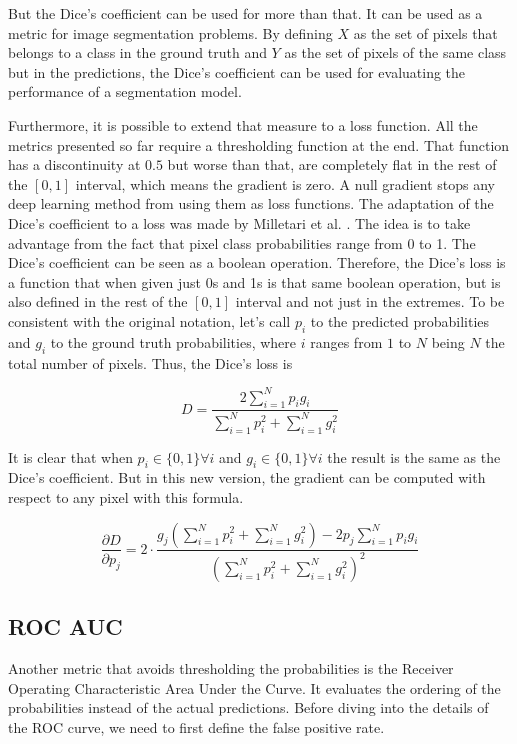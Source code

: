 But the Dice's coefficient can be used for more than that. It can be used as a metric for image segmentation problems. By defining $X$ as the set of pixels that belongs to a class in the ground truth and $Y$ as the set of pixels of the same class but in the predictions, the Dice's coefficient can be used for evaluating the performance of a segmentation model. 

Furthermore, it is possible to extend that measure to a loss function. All the metrics presented so far require a thresholding function at the end. That function has a discontinuity at $0.5$ but worse than that, are completely flat in the rest of the $[0,1]$ interval, which means the gradient is zero. A null gradient stops any deep learning method from using them as loss functions. The adaptation of the Dice's coefficient to a loss was made by Milletari et al. \cite{milletari2016vnet}. The idea is to take advantage from the fact that pixel class probabilities range from 0 to 1. The Dice's coefficient can be seen as a boolean operation. Therefore, the Dice's loss is a function that when given just 0s and 1s is that same boolean operation, but is also defined in the rest of the $[0,1]$ interval and not just in the extremes. To be consistent with the original notation, let's call $p_i$ to the predicted probabilities and $g_i$ to the ground truth probabilities, where $i$ ranges from $1$ to $N$ being $N$ the total number of pixels. Thus, the Dice's loss is

\begin{equation}
    D = \frac{2 \sum_{i=1}^N p_i g_i}{\sum_{i=1}^N p_i^2 + \sum_{i=1}^N g_i^2}
\end{equation}

It is clear that when $p_i \in \{0,1\} \forall i$ and $g_i \in \{0,1\} \forall i$ the result is the same as the Dice's coefficient. But in this new version, the gradient can be computed with respect to any pixel with this formula.

\begin{equation}
    \frac{\partial D}{\partial p_j} = 2\cdot \frac{g_j\left(\sum_{i=1}^N p_i^2 + \sum_{i=1}^N g_i^2\right) - 2p_j \sum_{i=1}^N p_ig_i}{\left(\sum_{i=1}^N p_i^2 + \sum_{i=1}^N g_i^2 \right)^2}
\end{equation}

\subsection{ROC AUC}

Another metric that avoids thresholding the probabilities is the Receiver Operating Characteristic Area Under the Curve. It evaluates the ordering of the probabilities instead of the actual predictions. Before diving into the details of the ROC curve, we need to first define the false positive rate.

